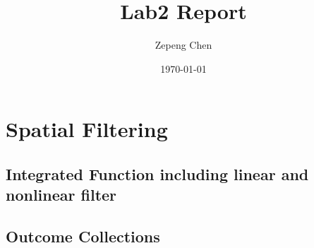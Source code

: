 \documentclass[14pt]{article}
\title{Lab2 Report}
\author{Zepeng Chen}
\date{\today}
\begin{document}
	\maketitle
	\tableofcontents
	\section{Spatial Filtering}
	\subsection{Integrated Function including linear and nonlinear filter}
	
	\newcommand{\RNum}[1]{\uppercase\expandafter{\romannumeral #1\relax}}
	\subsection{Outcome Collections \RNum{1}}
\end{document}
